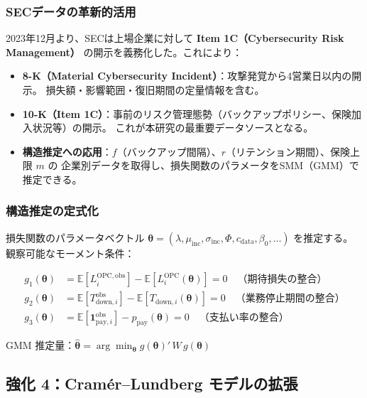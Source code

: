 \documentclass[a4paper,11pt]{article}
\newcommand{\E}{\mathbb{E}}
\newcommand{\ind}{\mathbf{1}}
\theoremstyle{definition}
\begin{document}
\subsubsection{SECデータの革新的活用}

2023年12月より、SECは上場企業に対して \textbf{Item 1C（Cybersecurity Risk Management）}
の開示を義務化した。これにより：

\begin{tcolorbox}[noveltybox, title={SEC開示データ活用の研究貢献}]
  \begin{itemize}[leftmargin=1.5em, itemsep=2pt]
    \item \textbf{8-K（Material Cybersecurity Incident）}：攻撃発覚から4営業日以内の開示。
    損失額・影響範囲・復旧期間の定量情報を含む。
    \item \textbf{10-K（Item 1C）}：事前のリスク管理態勢（バックアップポリシー、保険加入状況等）の開示。
    これが本研究の最重要データソースとなる。
    \item \textbf{構造推定への応用}：$f$（バックアップ間隔）、$r$（リテンション期間）、保険上限 $m$ の
    企業別データを取得し、損失関数のパラメータをSMM（GMM）で推定できる。
  \end{itemize}
\end{tcolorbox}

\subsubsection{構造推定の定式化}

損失関数のパラメータベクトル $\bm{\theta} = (\lambda, \mu_{\mathrm{inc}}, \sigma_{\mathrm{inc}}, \Phi, c_{\mathrm{data}}, \beta_0, \ldots)$ を推定する。
観察可能なモーメント条件：

\begin{align}
  g_1(\bm{\theta}) &= \E[L_i^{\mathrm{OPC,obs}}] - \E[L_i^{\mathrm{OPC}}(\bm{\theta})] = 0
  \quad \text{（期待損失の整合）} \\
  g_2(\bm{\theta}) &= \E[T_{\mathrm{down},i}^{\mathrm{obs}}] - \E[T_{\mathrm{down},i}(\bm{\theta})] = 0
  \quad \text{（業務停止期間の整合）} \\
  g_3(\bm{\theta}) &= \E[\ind_{\mathrm{pay},i}^{\mathrm{obs}}] - p_{\mathrm{pay}}(\bm{\theta}) = 0
  \quad \text{（支払い率の整合）}
\end{align}

GMM 推定量：$\hat{\bm{\theta}} = \arg\min_{\bm{\theta}} g(\bm{\theta})'\, W\, g(\bm{\theta})$

\subsection{強化 4：Cramér--Lundberg モデルの拡張}
\end{document}
